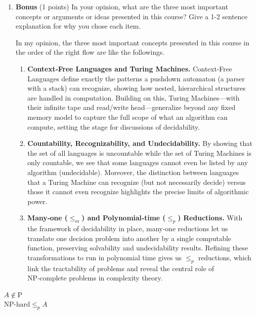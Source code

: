 \begin{enumerate}
    \item \textbf{Bonus} (1 points)
    In your opinion, what are the three most important 
    concepts or arguments or ideas presented in this course? 
    Give a 1-2 sentence explanation for why you chose each item.
    \begin{answer}
        In my opinion, the three most important concepts presented in this course in the order of 
        the right flow are like the followings.
        \begin{enumerate}
            \item \textbf{Context‑Free Languages and Turing Machines.} 
            Context‑Free Languages define exactly the patterns a pushdown 
            automaton (a parser with a stack) can recognize, showing how nested, 
            hierarchical structures are handled in computation. Building on this, 
            Turing Machines—with their infinite tape and read/write head—generalize 
            beyond any fixed memory model to capture the full scope of what an algorithm 
            can compute, setting the stage for discussions of decidability.  
            \item \textbf{Countability, Recognizability, and Undecidability.} By 
            showing that the set of all languages is uncountable while the set of 
            Turing Machines is only countable, we see that some languages cannot even 
            be listed by any algorithm (undecidable). Moreover, the distinction between 
            languages that a Turing Machine can recognize (but not necessarily decide) 
            versus those it cannot even recognize highlights the precise limits of 
            algorithmic power.  
            \item \textbf{Many‑one (\(\le_m\)) and Polynomial‑time (\(\le_p\)) Reductions.} 
            With the framework of decidability in place, many‑one reductions let us 
            translate one decision problem into another by a single computable 
            function, preserving solvability and undecidability results. Refining 
            these transformations to run in polynomial time gives us \(\le_p\) 
            reductions, which link the tractability of problems and reveal the central 
            role of NP‑complete problems in complexity theory.  
        \end{enumerate}
        
    \end{answer}
\end{enumerate}


\(A\notin\mathrm{P}\)\\
\(\text{NP-hard}\le_p A\)

